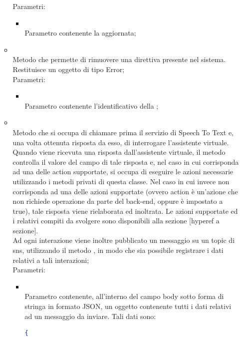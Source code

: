 \begin{itemize}
\begin{itemize}
		Parametri:
		\begin{itemize}
			\item {} \\
			Parametro contenente la  aggiornata;
		\end{itemize}
		\item[]  \\
		Metodo che permette di rimuovere una direttiva presente nel sistema. Restituisce un oggetto di tipo Error;\\
		Parametri:
		\begin{itemize}
			\item {} \\
			Parametro contenente l'identificativo della ;
		\end{itemize}
		\item[]  \\
		Metodo che si occupa di chiamare prima il servizio di Speech To Text e, una volta ottenuta risposta da esso, di interrogare l'assistente virtuale. Quando viene ricevuta una risposta dall'assistente virtuale, il metodo controlla il valore del campo  di tale risposta e, nel caso in cui corrisponda ad una delle action supportate, si occupa di eseguire le azioni necessarie utilizzando i metodi privati di questa classe. Nel caso in cui invece  non corrisponda ad una delle azioni supportate (ovvero action è un'azione che non richiede operazione da parte del back-end, oppure  è impostato a true), tale risposta viene rielaborata ed inoltrata. Le azioni supportate ed i relativi compiti da svolgere sono disponibili alla sezione [hyperef a sezione]. \\
Ad ogni interazione viene inoltre pubblicato un messaggio su un topic di sns, utilizzando il metodo , in modo che sia possibile registrare i dati relativi a tali interazioni;\\
		Parametri:
		\begin{itemize}
			\item {} \\
			Parametro contenente, all'interno del campo body sotto forma di stringa in formato JSON, un oggetto contenente tutti i dati relativi ad un messaggio da inviare. Tali dati sono:
\begin{lstlisting}[language=json,firstnumber=1]
{


\end{lstlisting}
\end{itemize}
\end{itemize}
\end{itemize}
